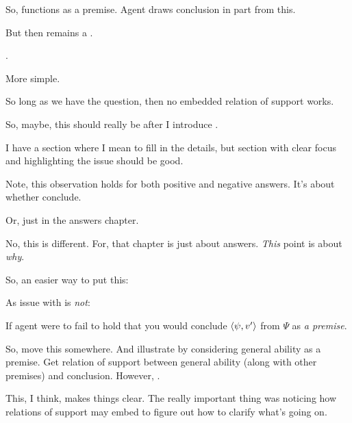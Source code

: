 \begin{note}
  So, functions as a premise.
  Agent draws conclusion in part from this.

  But then remains a \requ{}.

  \deadEnd{}.
\end{note}

\begin{note}
  More simple.

  So long as we have the question, then no embedded relation of support works.

  So, maybe, this should really be after I introduce \qzS{}.

  I have a section where I mean to fill in the details, but section with clear focus and highlighting the issue should be good.

  Note, this observation holds for both positive and negative answers.
  It's about whether conclude.

  Or, just in the answers chapter.

  No, this is different.
  For, that chapter is just about answers.
  \emph{This} point is about \emph{why}.

  So, an easier way to put this:

  As issue with \qzS{} is \emph{not}:

  If agent were to fail to hold that you would conclude \(\langle \psi, v' \rangle\) from \(\Psi\) as \emph{a premise}.

  So, move this somewhere.
  And illustrate by considering general ability as a premise.
  Get relation of support between general ability (along with other premises) and conclusion.
  However, \requ{}.

  This, I think, makes things clear.
  The really important thing was noticing how relations of support may embed to figure out how to clarify what's going on.
\end{note}

